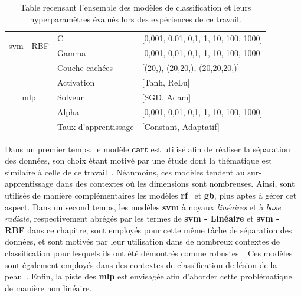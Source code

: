 \begin{table}[H]
\begin{tabular}{cll}
        \multirow{2}{*}{\gls{svm} - RBF}                & C                         & [0,001, 0,01, 0,1, 1, 10, 100, 1000]      \\ \cmidrule{2-3}   
                                                        & Gamma                     & [0,001, 0,01, 0,1, 1, 10, 100, 1000]      \\ \midrule 
        \multirow{5}{*}{\gls{mlp}}                      & Couche cachées            & [(20,), (20,20,), (20,20,20,)]            \\ \cmidrule{2-3}
                                                        & Activation                & [Tanh, ReLu]                              \\ \cmidrule{2-3}
                                                        & Solveur                   & [SGD, Adam]                               \\ \cmidrule{2-3}
                                                        & Alpha                     & [0,001, 0,01, 0,1, 1, 10, 100, 1000]      \\ \cmidrule{2-3}
                                                        & Taux d'apprentissage      & [Constant, Adaptatif]                     \\ \bottomrule 
    \end{tabular} 
    \caption{Table recensant l'ensemble des modèles de classification et leurs hyperparamètres évalués lors des expériences de ce travail.}
    \label{tab:image_classification_models_hyperparameters}
\end{table}\par

Dans un premier temps, le modèle \textbf{\gls{cart}} est utilisé afin de réaliser la séparation des données, son choix étant motivé par une étude dont la thématique est similaire à celle de ce travail~\cite{Wiltgen2008}. Néanmoins, ces modèles tendent au sur-apprentissage dans des contextes où les dimensions sont nombreuses. Ainsi, sont utilisés de  manière complémentaires les modèles \textbf{\gls{rf}}~\cite{Breiman2001} et \textbf{\gls{gb}}, plus aptes à gérer cet aspect. Dans un second temps, les modèles \textbf{\gls{svm}} à noyaux \textit{linéaires} et à \textit{base radiale}, respectivement abrégés par les termes de \textbf{\gls{svm} - Linéaire} et \textbf{\gls{svm} - RBF} dans ce chapitre, sont employés pour cette même tâche de séparation des données, et sont motivés par leur utilisation dans de nombreux contextes de classification pour lesquels ils ont été démontrés comme robustes~\cite{Smach2008a}. Ces modèles sont également employés dans des contextes de classification de lésion de la peau~\cite{Celebi2007}. Enfin, la piste des \textbf{\gls{mlp}} est envisagée afin d'aborder cette problématique de manière non linéaire.\par


